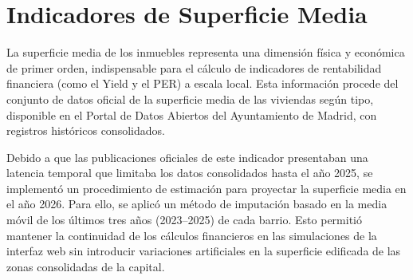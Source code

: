\documentclass[a4paper,11pt,openany]{book}
\begin{document}
\begin{table}[h!]
\centering
\renewcommand{\arraystretch}{1.5}
\caption{Fuentes de datos oficiales para la dimensión de barrio.}
\end{table}

\section{Indicadores de Superficie Media}
La superficie media de los inmuebles representa una dimensión física y económica de primer orden, indispensable para el cálculo de indicadores de rentabilidad financiera (como el Yield y el PER) a escala local. Esta información procede del conjunto de datos oficial de la superficie media de las viviendas según tipo, disponible en el Portal de Datos Abiertos del Ayuntamiento de Madrid, con registros históricos consolidados.

\begin{table}[h!]
\centering
\renewcommand{\arraystretch}{1.5}
\caption{Fuentes de datos oficiales para el análisis de superficies.}
\end{table}

Debido a que las publicaciones oficiales de este indicador presentaban una latencia temporal que limitaba los datos consolidados hasta el año 2025, se implementó un procedimiento de estimación para proyectar la superficie media en el año 2026. Para ello, se aplicó un método de imputación basado en la media móvil de los últimos tres años (2023--2025) de cada barrio. Esto permitió mantener la continuidad de los cálculos financieros en las simulaciones de la interfaz web sin introducir variaciones artificiales en la superficie edificada de las zonas consolidadas de la capital.
\end{document}
